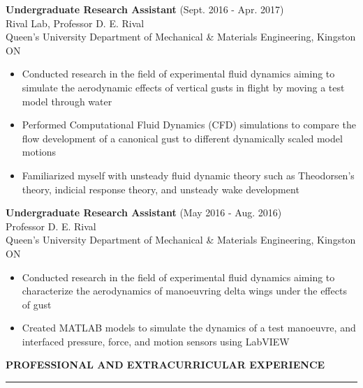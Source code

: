 \documentclass[11pt,letterpaper]{article}
\begin{document}
\textbf{Undergraduate Research Assistant} \hfill  (Sept. 2016 - Apr. 2017) \\ Rival Lab, Professor D. E. Rival \\ Queen's University Department of Mechanical \& Materials Engineering, Kingston ON
  \\
\vspace{-0.6cm}
\begin{itemize}
	\item Conducted research in the field of experimental fluid dynamics aiming to simulate the aerodynamic effects of vertical gusts in flight by moving a test model through water
	\vspace{-0.25cm}
	\item Performed Computational Fluid Dynamics (CFD) simulations to compare the flow development of a canonical gust to different dynamically scaled model motions
	\vspace{-0.25cm}
	\item Familiarized myself with unsteady fluid dynamic theory such as Theodorsen's theory, indicial response theory, and unsteady wake development
\end{itemize}
\vspace{-0.2cm}


\textbf{Undergraduate Research Assistant}  \hfill  (May 2016 - Aug. 2016) \\
 Professor D. E. Rival \\ Queen's University Department of Mechanical \& Materials Engineering, Kingston ON
\vspace{-0.2cm}
\begin{itemize}
	\item  Conducted research in the field of experimental fluid dynamics aiming to characterize the aerodynamics of manoeuvring delta wings under the effects of gust
	\vspace{-0.25cm}
	\item Created MATLAB models to simulate the dynamics of a test manoeuvre, and interfaced pressure, force, and motion sensors using LabVIEW
\end{itemize}
\vspace{-0.1cm}



{\large\textbf{PROFESSIONAL AND EXTRACURRICULAR EXPERIENCE}} %
\vspace{0.1cm}
\hrule
\vspace{0.25cm}
\end{document}
